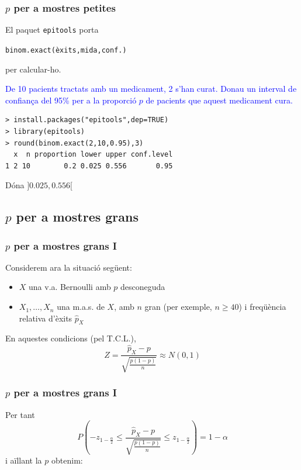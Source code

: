\documentclass[12pt,t]{beamer}
\newcommand{\blue}[1]{\textcolor{blue}{#1}}
\renewcommand{\leq}{\leqslant}
\renewcommand{\geq}{\geqslant}
\theoremstyle{plain}
\theoremstyle{definition}
\begin{document}
\begin{frame}[fragile]
\frametitle{$p$ per a mostres petites}
\vspace*{-2ex}

El paquet \texttt{epitools} porta
\begin{center}
{\tt binom.exact(èxits,mida,conf.)}
\end{center}
per calcular-ho.
\medskip

\blue{De 10 pacients tractats amb un medicament, 2 s'han curat. Donau un interval de confiança del 95\% per a la proporció $p$ de pacients que aquest medicament cura.}
\begin{verbatim}
> install.packages("epitools",dep=TRUE)
> library(epitools)
> round(binom.exact(2,10,0.95),3)
  x  n proportion lower upper conf.level
1 2 10        0.2 0.025 0.556       0.95
\end{verbatim}
Dóna $]0.025,0.556[$
\end{frame}

\subsection{$p$ per a mostres grans}


\begin{frame}
\frametitle{$p$ per a mostres grans I}

Considerem ara la situació següent:
\begin{itemize}
\item  $X$ una v.a. Bernoulli amb $p$ desconeguda

\item $X_1,\ldots,X_n$ una m.a.s. de $X$, amb $n$  gran (per exemple, $n\geq 40$) i freqüència relativa d'èxits $\widehat{p}_{X}$
\end{itemize}
\medskip

En aquestes condicions (pel T.C.L.), 
$$
Z=\dfrac{\widehat{p}_{X}-p}
{\sqrt{\frac{p(1-p)}{n}}}\approx N(0,1)
$$
\end{frame}


\begin{frame}
\frametitle{$p$ per a mostres grans I}
Per tant
$$
P\left(-z_{1-\frac{\alpha}{2}}\leq \dfrac{\widehat{p}_{X}-p}
{\sqrt{\frac{p(1-p)}{n}}}\leq z_{1-\frac{\alpha}{2}}\right)=1-\alpha
$$
i aïllant la $p$ obtenim:
\end{frame}
\end{document}
